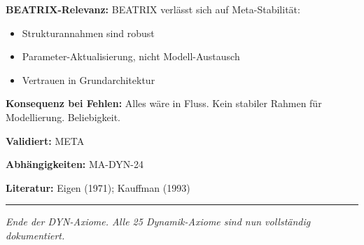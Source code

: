 \textbf{BEATRIX-Relevanz:}
BEATRIX verlässt sich auf Meta-Stabilität:
\begin{itemize}
    \item Strukturannahmen sind robust
    \item Parameter-Aktualisierung, nicht Modell-Austausch
    \item Vertrauen in Grundarchitektur
\end{itemize}

\textbf{Konsequenz bei Fehlen:}
Alles wäre in Fluss. Kein stabiler Rahmen für Modellierung. Beliebigkeit.

\textbf{Validiert:} META

\textbf{Abhängigkeiten:} MA-DYN-24

\textbf{Literatur:} Eigen (1971); Kauffman (1993)

\bigskip
\noindent\rule{\textwidth}{0.4pt}
\textit{Ende der DYN-Axiome. Alle 25 Dynamik-Axiome sind nun vollständig dokumentiert.}
